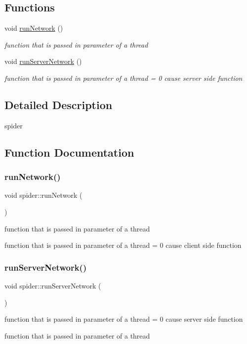 \subsection*{Functions}
\begin{DoxyCompactItemize}
\item 
void \hyperlink{namespacespider_ad806415830484a55ea106095ca987a43}{run\+Network} ()
\begin{DoxyCompactList}\small\item\em function that is passed in parameter of a thread \end{DoxyCompactList}\item 
void \hyperlink{namespacespider_a56d84cdc8057a1c0564893698ff039c5}{run\+Server\+Network} ()
\begin{DoxyCompactList}\small\item\em function that is passed in parameter of a thread = 0 cause server side function \end{DoxyCompactList}\end{DoxyCompactItemize}


\subsection{Detailed Description}
spider 

\subsection{Function Documentation}
\mbox{\label{namespacespider_ad806415830484a55ea106095ca987a43}} 
\subsubsection{\texorpdfstring{run\+Network()}{runNetwork()}}
{\footnotesize\ttfamily void spider\+::run\+Network (\begin{DoxyParamCaption}{ }\end{DoxyParamCaption})}



function that is passed in parameter of a thread 

function that is passed in parameter of a thread = 0 cause client side function \mbox{\label{namespacespider_a56d84cdc8057a1c0564893698ff039c5}} 
\subsubsection{\texorpdfstring{run\+Server\+Network()}{runServerNetwork()}}
{\footnotesize\ttfamily void spider\+::run\+Server\+Network (\begin{DoxyParamCaption}{ }\end{DoxyParamCaption})}



function that is passed in parameter of a thread = 0 cause server side function 

function that is passed in parameter of a thread 